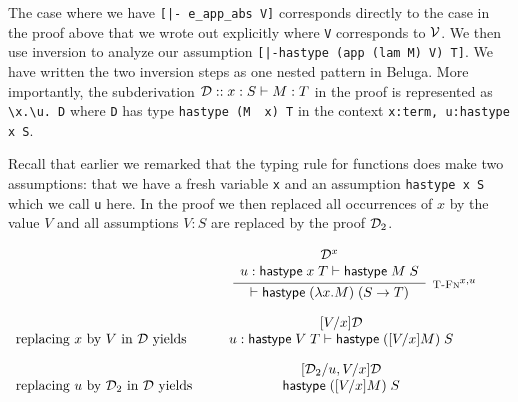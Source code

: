 The case where
we have  \lstinline![|- e_app_abs V]!
corresponds directly to the case in the proof above that we
wrote out explicitly where \lstinline!V! corresponds to ${\mathcal{V}}$. We then
use inversion to analyze our assumption
\lstinline![|-hastype (app (lam M) V) T]!. We have written the two
inversion steps as one nested pattern in Beluga. More importantly, the
subderivation $\mathbin{{\mathcal{D}} :: x:S \vdash M:T }$ in the proof is represented as
\lstinline!\x.\u. D! where
\lstinline!D! has type \lstinline!hastype (M  x) T! in the context \lstinline!x:term, u:hastype x S!.

Recall that earlier we remarked that the
typing rule for functions does make two assumptions: that we have a
fresh variable \lstinline!x! and an assumption \lstinline!hastype x S!
which we call \lstinline!u! here. In the proof we then replaced all
occurrences of $x$ by the value $V$ and all assumptions $V:S$ are
replaced by the proof ${\mathcal{D}}_2$.

\begin{small}

\[
\begin{array}{l@{\quad}c@{\quad}l@{\quad}c}
& \qquad\infer[\TFn^{x,u}]
       {\vdash \tmhastype {(\lam x. M)}{(S \arrow T)}}
       {\above{\D^x}{u:\tmhastype x T \vdash \tmhastype M S}} & & \\[1em]
\mbox{replacing $x$ by $V$ in $\D$ yields} &
       {\above{[V/x]\D}{u:\tmhastype V T \vdash \tmhastype {([V/x]M)} S}} & \\[1em]
\mbox{replacing $u$ by $\D_2$ in $\D$ yields} &
\above{[\D_2/u, V/x]\D}{\tmhastype {([V/x]M)} S}
\end{array}
\]

\end{small}


